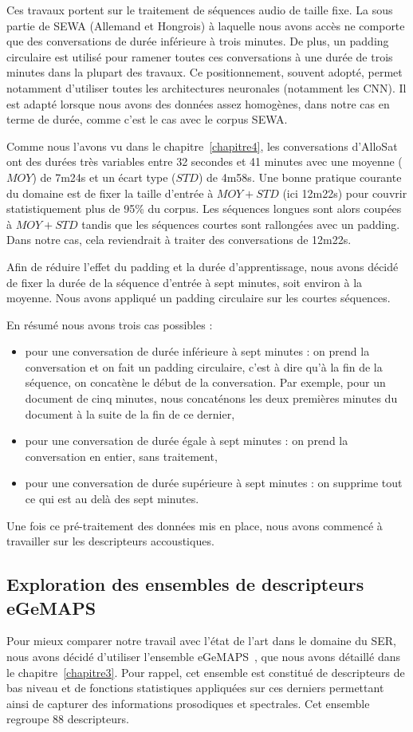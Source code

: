 Ces travaux portent sur le traitement de séquences audio de taille fixe. La sous partie de SEWA  (Allemand et Hongrois) à laquelle nous avons accès ne comporte que des conversations de durée inférieure à trois minutes. De plus, un padding circulaire est utilisé pour ramener toutes ces conversations à une durée de trois minutes dans la plupart des travaux. Ce positionnement, souvent adopté, permet notamment d'utiliser toutes les architectures neuronales (notamment les CNN). Il est adapté lorsque nous avons des données assez homogènes, dans notre cas en terme de durée, comme c'est le cas avec le corpus SEWA.

Comme nous l'avons vu dans le chapitre~\ref{chapitre4}, les conversations d'AlloSat ont des durées très variables entre 32 secondes et 41 minutes avec une moyenne ($MOY$) de 7m24s et un écart type ($STD$) de 4m58s. Une bonne pratique courante du domaine est de fixer la taille d'entrée à $MOY + STD$ (ici 12m22s) pour couvrir statistiquement plus de 95\% du corpus. Les séquences longues sont alors coupées à $MOY + STD$ tandis que les séquences courtes sont rallongées avec un padding. Dans notre cas, cela reviendrait à traiter des conversations de 12m22s.

Afin de réduire l'effet du padding et la durée d'apprentissage, nous avons décidé de fixer la durée de la séquence d'entrée à sept minutes, soit environ à la moyenne. Nous avons appliqué un padding circulaire sur les courtes séquences.

En résumé nous avons trois cas possibles :
\begin{itemize}
  \item pour une conversation de durée inférieure à sept minutes : on prend la conversation et on fait un padding circulaire, c'est à dire qu'à la fin de la séquence, on concatène le début de la conversation. Par exemple, pour un document de cinq minutes, nous concaténons les deux premières minutes du document à la suite de la fin de ce dernier,
  \item pour une conversation de durée égale à sept minutes : on prend la conversation en entier, sans traitement,
  \item pour une conversation de durée supérieure à sept minutes : on supprime tout ce qui est au delà des sept minutes.
\end{itemize}

Une fois ce pré-traitement des données mis en place, nous avons commencé à travailler sur les descripteurs accoustiques.

\subsection{Exploration des ensembles de descripteurs eGeMAPS}
Pour mieux comparer notre travail avec l'état de l'art dans le domaine du SER, nous avons décidé d'utiliser l'ensemble eGeMAPS~\cite{Eyben2016}, que nous avons détaillé dans le chapitre~\ref{chapitre3}. Pour rappel, cet ensemble est constitué de descripteurs de bas niveau et de fonctions statistiques appliquées sur ces derniers permettant ainsi de capturer des informations prosodiques et spectrales. Cet ensemble regroupe 88 descripteurs.

